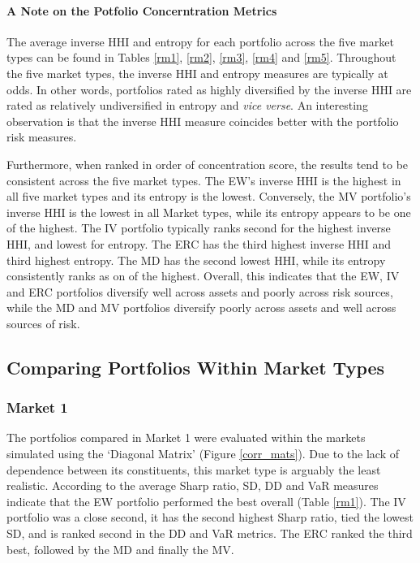 \documentclass[11pt,preprint, authoryear]{elsarticle}
\numberwithin{equation}{section}
\numberwithin{figure}{section}
\numberwithin{table}{section}
\begin{document}
\hypertarget{a-note-on-the-potfolio-concerntration-metrics}{%
\paragraph{\texorpdfstring{A Note on the Potfolio Concerntration Metrics
\label{cn}}{A Note on the Potfolio Concerntration Metrics }}\label{a-note-on-the-potfolio-concerntration-metrics}}

The average inverse HHI and entropy for each portfolio across the five
market types can be found in Tables \ref{rm1}, \ref{rm2}, \ref{rm3},
\ref{rm4} and \ref{rm5}. Throughout the five market types, the inverse
HHI and entropy measures are typically at odds. In other words,
portfolios rated as highly diversified by the inverse HHI are rated as
relatively undiversified in entropy and \emph{vice verse}. An
interesting observation is that the inverse HHI measure coincides better
with the portfolio risk measures.

Furthermore, when ranked in order of concentration score, the results
tend to be consistent across the five market types. The EW's inverse HHI
is the highest in all five market types and its entropy is the lowest.
Conversely, the MV portfolio's inverse HHI is the lowest in all Market
types, while its entropy appears to be one of the highest. The IV
portfolio typically ranks second for the highest inverse HHI, and lowest
for entropy. The ERC has the third highest inverse HHI and third highest
entropy. The MD has the second lowest HHI, while its entropy
consistently ranks as on of the highest. Overall, this indicates that
the EW, IV and ERC portfolios diversify well across assets and poorly
across risk sources, while the MD and MV portfolios diversify poorly
across assets and well across sources of risk.

\hypertarget{comparing-portfolios-within-market-types}{%
\subsection{\texorpdfstring{Comparing Portfolios Within Market Types
\label{within-market}}{Comparing Portfolios Within Market Types }}\label{comparing-portfolios-within-market-types}}

\hypertarget{market-1}{%
\subsubsection{Market 1}\label{market-1}}

The portfolios compared in Market 1 were evaluated within the markets
simulated using the `Diagonal Matrix' (Figure \ref{corr_mats}). Due to
the lack of dependence between its constituents, this market type is
arguably the least realistic. According to the average Sharp ratio, SD,
DD and VaR measures indicate that the EW portfolio performed the best
overall (Table \ref{rm1}). The IV portfolio was a close second, it has
the second highest Sharp ratio, tied the lowest SD, and is ranked second
in the DD and VaR metrics. The ERC ranked the third best, followed by
the MD and finally the MV.
\end{document}
